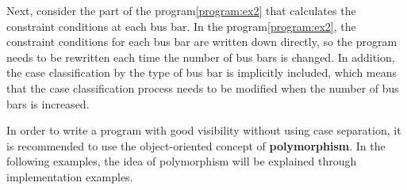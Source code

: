 \documentclass[tombow,dvipdfmx]{corona-a5-1.1}
\begin{document}
Next, consider the part of the program\nobreak\ref{program:ex2} that calculates the constraint conditions at each bus bar.
In the program\nobreak\ref{program:ex2}, the constraint conditions for each bus bar are written down directly, so the program needs to be rewritten each time the number of bus bars is changed.
In addition, the case classification by the type of bus bar is implicitly included, which means that the case classification process needs to be modified when the number of bus bars is increased.

In order to write a program with good visibility without using case separation, it is recommended to use the object-oriented concept of \textbf{polymorphism}.
In the following examples, the idea of polymorphism will be explained through implementation examples.
\end{document}
